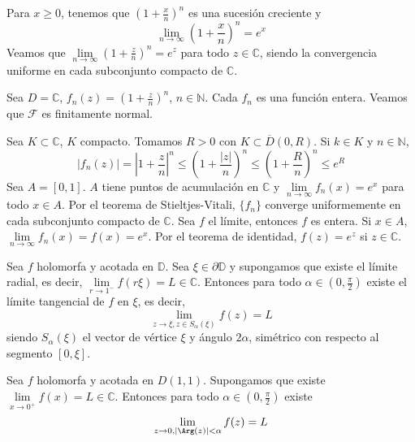 
\begin{example}
    Para $x \geq 0$, tenemos que $\left(1 + \frac{x}{n}\right)^n$ es una sucesión creciente y
    $$\lim\limits_{n \to \infty} \left(1 + \frac{x}{n}\right)^n = e^x$$
    Veamos que $\lim\limits_{n \to \infty} \left(1 + \frac{z}{n}\right)^n = e^z$ para todo $z \in \mathbb{C}$, siendo la convergencia uniforme en cada subconjunto compacto de $\mathbb{C}$.

    Sea $D = \mathbb{C}$, $f_n(z) = \left(1 + \frac{z}{n}\right)^n$, $n \in \mathbb{N}$.
    Cada $f_n$ es una función entera.
    Veamos que $\mathcal{F}$ es finitamente normal.

    Sea $K \subset \mathbb{C}$, $K$ compacto.
    Tomamos $R > 0$ con $K \subset \overline{D}(0, R)$.
    Si $k \in K$ y $n \in \mathbb{N}$,
    $$|f_n(z)| = \left|1 + \frac{z}{n}\right|^n \leq \left(1 + \frac{|z|}{n}\right)^n \leq \left(1 + \frac{R}{n}\right)^n \leq e^R$$
    Sea $A = [0, 1]$.
    $A$ tiene puntos de acumulación en $\mathbb{C}$ y $\lim\limits_{n \to \infty} f_n(x) = e^x$ para todo $x \in A$.
    Por el teorema de Stieltjes-Vitali, $\{f_n\}$ converge uniformemente en cada subconjunto compacto de $\mathbb{C}$.
    Sea $f$ el límite, entonces $f$ es entera.
    Si $x \in A$, $\lim\limits_{n \to \infty} f_n(x) = f(x) = e^x$.
    Por el teorema de identidad, $f(z) = e^z$ si $z \in \mathbb{C}$.
\end{example}

\begin{theorem}
    Sea $f$ holomorfa y acotada en $\mathbb{D}$.
    Sea $\xi \in \partial \mathbb{D}$ y supongamos que existe el límite radial, es decir, $\lim\limits_{r \to 1^-} f(r\xi) = L \in \mathbb{C}$.
    Entonces para todo $\alpha \in (0, \frac{\pi}{2})$ existe el límite tangencial de $f$ en $\xi$, es decir,
    $$\lim\limits_{z \to \xi, z \in S_\alpha(\xi)} f(z) = L$$
    siendo $S_\alpha(\xi)$ el vector de vértice $\xi$ y ángulo $2\alpha$, simétrico con respecto al segmento $[0, \xi]$.
\end{theorem}

\begin{theorem}
    Sea $f$ holomorfa y acotada en $D(1, 1)$.
    Supongamos que existe $\lim\limits_{x \to 0^+} f(x) = L \in \mathbb{C}$.
    Entonces para todo $\alpha \in (0, \frac{\pi}{2})$ existe
    $$\lim\limits_{z \to 0, |\Arg(z)| < \alpha} f(z) = L$$
\end{theorem}

